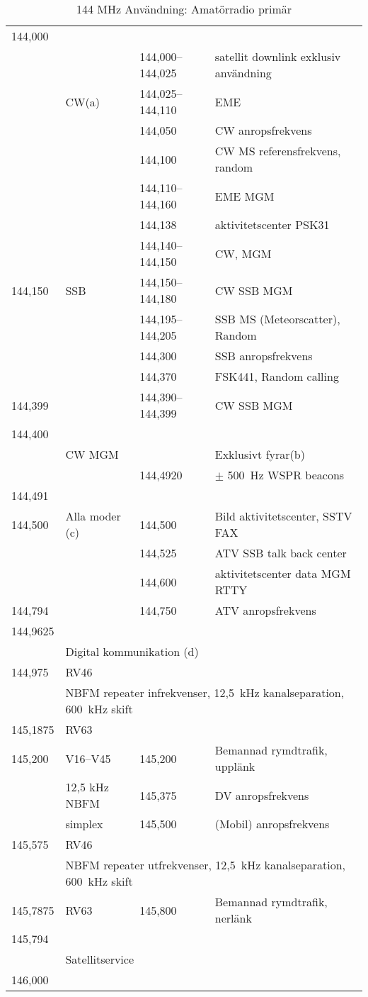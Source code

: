 \setlongtables
\begin{longtable}{llll}
\caption{144 MHz Användning: Amatörradio primär}\\

144,000 & & &\\
        & & 144,000--144,025 & satellit downlink exklusiv användning\\
        & CW(a) & 144,025--144,110 & EME\\
        & & 144,050 & CW anropsfrekvens \\
        & & 144,100 & CW MS referensfrekvens, random\\
        & & 144,110--144,160 & EME MGM\\
        & & 144,138 & aktivitetscenter PSK31\\
        & & 144,140--144,150 & CW, MGM\\
144,150 & SSB & 144,150--144,180 & CW SSB MGM\\
        & & 144,195--144,205 & SSB MS (Meteorscatter), Random\\
        & & 144,300 & SSB anropsfrekvens\\
        & & 144,370 & FSK441, Random calling\\
144,399 & & 144,390--144,399 & CW SSB MGM\\
144,400 & & &\\
        & CW MGM & & Exklusivt fyrar(b)\\
        & & 144,4920 & \(\pm\) 500~Hz WSPR beacons\\
144,491 & & &\\
144,500 & Alla moder (c) & 144,500 & Bild aktivitetscenter, SSTV FAX\\
        & & 144,525 & ATV SSB talk back center \\
        & & 144,600 & aktivitetscenter data MGM RTTY\\
144,794 & & 144,750 & ATV anropsfrekvens \\
144,9625 & & & \\
        & \multicolumn{3}{l}{Digital kommunikation (d)}\\
144,975 & RV46 & &\\
        & \multicolumn{3}{l}{NBFM repeater infrekvenser, 12,5~kHz kanalseparation, 600~kHz skift} \\
145,1875 & RV63 & & \\
145,200 & V16--V45 & 145,200 & Bemannad rymdtrafik, upplänk \\
        & 12,5 kHz NBFM & 145,375 & DV anropsfrekvens\\
        & simplex & 145,500 & (Mobil) anropsfrekvens\\
145,575 & RV46 & & \\
        & \multicolumn{3}{l}{NBFM repeater utfrekvenser, 12,5~kHz kanalseparation, 600~kHz skift} \\
145,7875 & RV63 & 145,800 & Bemannad rymdtrafik, nerlänk \\
145,794 & & & \\
        & \multicolumn{3}{l}{Satellitservice} \\
146,000 & & & \\
\end{longtable}

